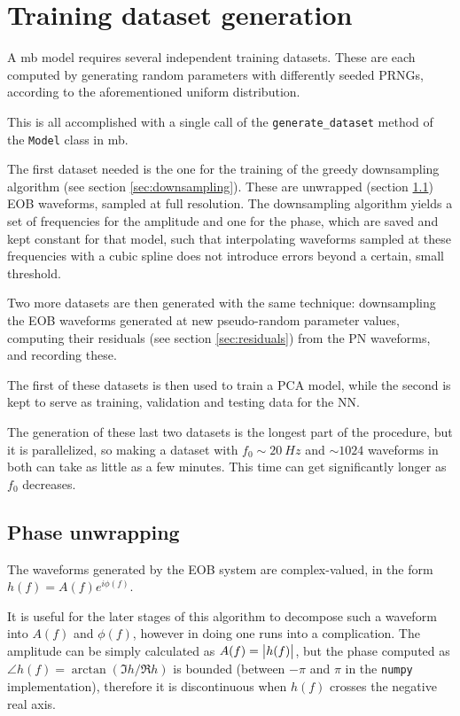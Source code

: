 \documentclass[main.tex]{subfiles}
\begin{document}
\section{Training dataset generation}

A \ac{mb} model requires several independent training datasets. These are each computed by generating random parameters with differently seeded \acp{PRNG}, according to the aforementioned uniform distribution.

This is all accomplished with a single call of the \texttt{generate\_dataset} method of the \texttt{Model} class in \ac{mb}.

The first dataset needed is the one for the training of the greedy downsampling algorithm (see section \ref{sec:downsampling}). 
These are unwrapped (section \ref{sec:unwrapping}) \ac{EOB} waveforms, sampled at full resolution. 
The downsampling algorithm yields a set of frequencies for the amplitude and one for the phase, which are saved and kept constant for that model, such that interpolating waveforms sampled at these frequencies with a cubic spline does not introduce errors beyond a certain, small threshold.

Two more datasets are then generated with the same technique: 
downsampling the \ac{EOB} waveforms generated at new pseudo-random parameter values, computing their residuals (see section \ref{sec:residuals}) from the \ac{PN} waveforms, and recording these. 

The first of these datasets is then used to train a \ac{PCA} model, while the second is kept to serve as training, validation and testing data for the \ac{NN}.

The generation of these last two datasets is the longest part of the procedure, but it is parallelized, so making a dataset with \(f_0 \sim \SI{20}{Hz}\) and \(\sim 1024\) waveforms in both can take as little as a few minutes.
This time can get significantly longer as \(f_0 \) decreases. 

\subsection{Phase unwrapping} \label{sec:unwrapping}

The waveforms generated by the \ac{EOB} system are complex-valued, in the form \(h(f) = A(f) e^{i \phi (f)}\).

It is useful for the later stages of this algorithm to decompose such a waveform into \(A(f)\) and \(\phi (f)\), however in doing one runs into a complication.
The amplitude can be simply calculated as \(A(f) = \abs{h(f)}\), but the phase computed as \(\angle h(f) = \arctan (\Im h / \Re h)\) is bounded (between \(-\pi \) and \( \pi \) in the \texttt{numpy} implementation), therefore it is discontinuous when \(h(f)\) crosses the negative real axis. 
\end{document}
